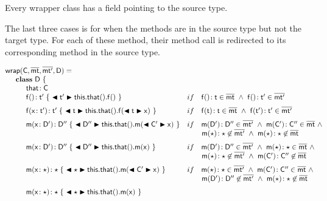 \documentclass[acmlarge, anonymous, authordraft]{acmart}
\begin{document}
% 

Every wrapper class has a  field pointing to the source type.

The last three cases is for when the methods are in the source type but not the 
target type. For each of these method, their method call is redirected 
to its corresponding method in the source type.


\newcommand{\bscast}[2]{\EM{\BehCast{#1}{{#2}}}}

\vspace{4mm}
\[\begin{array}{@{}ll@{}l@{}r@{~}c@{~}r}
    \wrap\C\bmt\bmtp\D = \\
\SP \class ~\D ~ \{\\
\SPP \Fdef\that\C \\
\SPP \Mdefz\f{\tp}{~\bscast\tp{\Get{\Get\this\that}\f}~}
&    if\,\,\,\,\,\, \Mtype\f{}\t\in\bmt ~\wedge~ \Mtype\f{}\tp \in \bmtp \\
\\[-2mm]
\SPP \Mdef\f\x\tp\tp {~\bscast\t{\Set{\Get\this\that}\f{\bscast\t\x}}~}
&    if\,\,\,\,\,\, \Mtype\f\t\t \in \bmt ~\wedge~ \Mtype\f\tp\tp \in \bmtp \\
\\[-2mm]
\SPP \Mdef\m\x\Dp\Dpp {~\bscast\Dpp{{\Call{\Get\this\that} \m {\bscast{\Cp}\x} }}~}
&     if\,\,\,\,\,\, \Mtype\m\Dp\Dpp\in\bmtp ~\wedge~ \Mtype\m\Cp\Cpp\in\bmt ~\wedge~  \\
&     \multicolumn{5}{l}{\qquad \Mtype\m\any\any\not\in\bmtp ~\wedge~ \Mtype\m\any\any\not\in\bmt} \\
\\[-2mm]
\SPP \Mdef\m\x\Dp\Dpp{~\bscast\Dpp{\Call{\Get\this\that} \m {\x} }~}
&    if\,\,\,\,\,\, \Mtype\m\Dp\Dpp\in\bmtp ~\wedge~ \Mtype\m\any\any\in\bmt~\wedge~  \\
&     \multicolumn{5}{l}{\qquad \Mtype\m\any\any\not\in\bmtp ~\wedge~ \Mtype\m\Cp\Cpp\not\in\bmt} \\
\\[-2mm]
\SPP \Mdef\m\x\any\any{~\bscast\any{\Call{\Get\this\that} \m {\bscast{\Cp}\x} }~}
&    if\,\,\,\,\,\, \Mtype\m\any\any\in\bmtp ~\wedge~ \Mtype\m\Cp\Cpp\in\bmt ~\wedge~  \\
&     \multicolumn{5}{l}{\qquad \Mtype\m\Dp\Dpp\not\in\bmtp ~\wedge~ \Mtype\m\any\any\not\in\bmt} \\
\\[-2mm]
\SPP \Mdef\m\x\any\any{~\bscast\any{\Call{\Get\this\that} \m {\x} }~}

\end{array}\]
\end{document}
